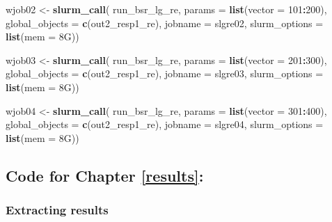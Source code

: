 \documentclass[12pt, twoside]{amherstthesis}
\newenvironment{Shaded}{\begin{snugshade}}{\end{snugshade}}
\newcommand{\AttributeTok}[1]{\textcolor[rgb]{0.13,0.29,0.53}{#1}}
\newcommand{\DecValTok}[1]{\textcolor[rgb]{0.00,0.00,0.81}{#1}}
\newcommand{\FunctionTok}[1]{\textcolor[rgb]{0.13,0.29,0.53}{\textbf{#1}}}
\newcommand{\NormalTok}[1]{#1}
\newcommand{\OtherTok}[1]{\textcolor[rgb]{0.56,0.35,0.01}{#1}}
\newcommand{\SpecialCharTok}[1]{\textcolor[rgb]{0.81,0.36,0.00}{\textbf{#1}}}
\newcommand{\StringTok}[1]{\textcolor[rgb]{0.31,0.60,0.02}{#1}}
\begin{document}
\begin{Shaded}
\begin{Highlighting}[]
\NormalTok{wjob02 }\OtherTok{\textless{}{-}} \FunctionTok{slurm\_call}\NormalTok{(}
\NormalTok{  run\_bsr\_lg\_re, }\AttributeTok{params =} \FunctionTok{list}\NormalTok{(}\AttributeTok{vector =} \DecValTok{101}\SpecialCharTok{:}\DecValTok{200}\NormalTok{),}
  \AttributeTok{global\_objects =} \FunctionTok{c}\NormalTok{(}\StringTok{\textquotesingle{}out2\_resp1\_re\textquotesingle{}}\NormalTok{),}
  \AttributeTok{jobname =} \StringTok{\textquotesingle{}slgre02\textquotesingle{}}\NormalTok{,}
  \AttributeTok{slurm\_options =} \FunctionTok{list}\NormalTok{(}\AttributeTok{mem =} \StringTok{\textquotesingle{}8G\textquotesingle{}}\NormalTok{))}

\NormalTok{wjob03 }\OtherTok{\textless{}{-}} \FunctionTok{slurm\_call}\NormalTok{(}
\NormalTok{  run\_bsr\_lg\_re, }\AttributeTok{params =} \FunctionTok{list}\NormalTok{(}\AttributeTok{vector =} \DecValTok{201}\SpecialCharTok{:}\DecValTok{300}\NormalTok{),}
  \AttributeTok{global\_objects =} \FunctionTok{c}\NormalTok{(}\StringTok{\textquotesingle{}out2\_resp1\_re\textquotesingle{}}\NormalTok{),}
  \AttributeTok{jobname =} \StringTok{\textquotesingle{}slgre03\textquotesingle{}}\NormalTok{,}
  \AttributeTok{slurm\_options =} \FunctionTok{list}\NormalTok{(}\AttributeTok{mem =} \StringTok{\textquotesingle{}8G\textquotesingle{}}\NormalTok{))}

\NormalTok{wjob04 }\OtherTok{\textless{}{-}} \FunctionTok{slurm\_call}\NormalTok{(}
\NormalTok{  run\_bsr\_lg\_re, }\AttributeTok{params =} \FunctionTok{list}\NormalTok{(}\AttributeTok{vector =} \DecValTok{301}\SpecialCharTok{:}\DecValTok{400}\NormalTok{),}
  \AttributeTok{global\_objects =} \FunctionTok{c}\NormalTok{(}\StringTok{\textquotesingle{}out2\_resp1\_re\textquotesingle{}}\NormalTok{),}
  \AttributeTok{jobname =} \StringTok{\textquotesingle{}slgre04\textquotesingle{}}\NormalTok{,}
  \AttributeTok{slurm\_options =} \FunctionTok{list}\NormalTok{(}\AttributeTok{mem =} \StringTok{\textquotesingle{}8G\textquotesingle{}}\NormalTok{))}
\end{Highlighting}
\end{Shaded}
\normalsize

\hypertarget{code-for-chapter-refresults}{%
\subsection{Code for Chapter \ref{results}:}\label{code-for-chapter-refresults}}

\hypertarget{extracting-results}{%
\subsubsection{Extracting results}\label{extracting-results}}
\end{document}
